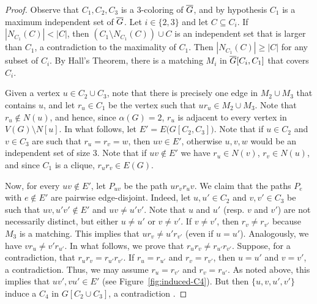 \documentclass[a4paper,12pt]{article}
\begin{document}
\begin{proof}
	Observe that \(C_1,C_2,C_3\) is a \(3\)-coloring of \(\overline{G}\),
	and by hypothesis \(C_1\) is a maximum independent set of \(\overline{G}\).
	Let \(i\in\{2,3\}\) and let \(C\subseteq C_i\).
	If \(|N_{C_1}(C)| < |C|\), 
	then \((C_1\setminus N_{C_1}(C))\cup C\) is an independent set that is larger than \(C_1\),
	a contradiction to the maximality of \(C_1\).
	Then \(|N_{C_1}(C)| \geq |C|\) for any subset of \(C_i\).
	By Hall's Theorem, there is a matching \(M_i\) in \(\overline{G}[C_i,C_1]\) that covers \(C_i\).
	
	Given a vertex \(u\in C_2 \cup C_3\), 
	note that there is precisely one edge in \(M_2\cup M_3\) that contains \(u\),
	and let \(r_u\in C_1\) be the vertex such that \(ur_u\in M_2\cup M_3\).
	Note that \(r_u \notin N(u)\),
	and hence, since \(\alpha(G) = 2\), \(r_u\) is adjacent to every vertex in \(V(G)\setminus N[u]\).
	In what follows, let \(E' = E\big(G[C_2,C_3]\big)\).
	Note that if \(u\in C_2\) and \(v\in C_3\) are such that \(r_u = r_v = w\),
	then \(uv \in E'\), otherwise \(u,v,w\) would be an independent set of size \(3\).
%	
	Note that if \(uv\notin E'\) we have \(r_u\in N(v)\), \(r_v\in N(u)\),
	and since \(C_1\) is a clique, \(r_ur_v\in E(G)\).

	Now, for every \(uv\notin E'\), let \(P_{uv}\) be the path \(u r_v r_u v\).
	We claim that the paths \(P_e\) with \(e\notin E'\) are pairwise edge-disjoint.
	Indeed, let \(u,u' \in C_2\) and \(v,v' \in C_3\) be such that \(uv,u'v' \notin E'\)
	and \(uv \neq u'v'\).
	Note that \(u\) and \(u'\) (resp. \(v\) and \(v'\)) are not necessarily distinct,
	but either \(u \neq u'\) or \(v \neq v'\).
	If \(v\neq v'\), then \(r_v \neq r_{v'}\) because \(M_3\) is a matching.
	This implies that \(ur_v \neq u'r_{v'}\) (even if \(u = u'\)).
	Analogously, we have \(vr_u \neq v'r_{u'}\).
	In what follows, we prove that \(r_ur_v \neq r_{u'}r_{v'}\).
	Suppose, for a contradiction, that \(r_ur_v = r_{u'}r_{v'}\).
	If \(r_u = r_{u'}\) and \(r_v = r_{v'}\), then \(u=u'\) and \(v=v'\), a contradiction.
	Thus, we may assume \(r_u = r_{v'}\) and \(r_v = r_{u'}\).
	As noted above, this implies that \(uv',vu' \in E'\) (see Figure~\ref{fig:induced-C4}).
	But then \(\{u,v,u',v'\}\) induce a \(C_4\) in \(G[C_2\cup C_3]\),
	a contradiction .
\end{proof}
\end{document}
